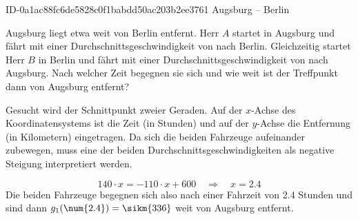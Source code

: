 \begin{exercise}
      {ID-0a1ac88fc6de5828c0f1babdd50ac203b2ee3761}
      {Augsburg -- Berlin}
  \ifproblem\problem\par
    Augsburg liegt etwa  weit von Berlin entfernt. Herr $A$ startet
    in Augsburg und fährt mit einer Durchschnittsgeschwindigkeit von 
    nach Berlin. Gleichzeitig startet Herr $B$ in Berlin und fährt mit einer
    Durchschnittsgeschwindigkeit von  nach Augsburg.
    Nach welcher Zeit begegnen sie sich und wie weit ist der Treffpunkt dann
    von Augsburg entfernt?
  \fi
  \ifoutline\outline\par
    Gesucht wird der Schnittpunkt zweier Geraden. Auf der $x$-Achse des Koordinatensystems
    ist die Zeit (in Stunden) und auf der $y$-Achse die Entfernung (in Kilometern) eingetragen.
    Da sich die beiden Fahrzeuge aufeinander zubewegen, muss eine der beiden
    Durchschnittsgeschwindigkeiten als negative Steigung interpretiert werden.
    \begin{center}
    \end{center}
  \fi
  \ifoutcome\outcome\par
    \begin{equation*}
      \num{140}\cdot x=\num{-110}\cdot x+600
      \quad\Rightarrow\quad
      x=\num{2.4}
    \end{equation*}
    Die beiden Fahrzeuge begegnen sich also nach einer Fahrzeit von \num{2.4}
    Stunden und sind dann $g_1(\num{2.4})=\sikm{336}$ weit von Augsburg entfernt.
  \fi
\end{exercise}
